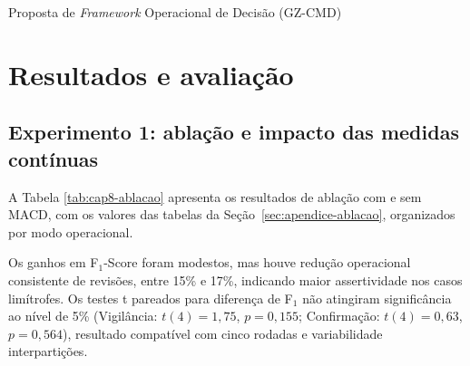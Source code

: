 \begin{chapter}{Proposta de \textit{Framework} Operacional de Decisão (GZ-CMD)}
\section{Resultados e avaliação}
\label{sec:cap8-resultados}

\subsection{Experimento 1: ablação e impacto das medidas contínuas}
\label{sec:cap8-exp1}

A Tabela \ref{tab:cap8-ablacao} apresenta os resultados de ablação com e sem MACD, com os valores das tabelas da Seção~\ref{sec:apendice-ablacao}, organizados por modo operacional.

\begin{table}[!ht]
\centering
\caption{Resultados do experimento de ablação (média $\pm$ desvio-padrão, 5 rodadas). A coluna ``Revisões'' indica o número absoluto de pares encaminhados à revisão por LLM em cada partição de teste.}
\label{tab:cap8-ablacao}
\end{table}

Os ganhos em F$_1$-Score foram modestos, mas houve redução operacional consistente de revisões, entre 15\% e 17\%, indicando maior assertividade nos casos limítrofes. Os testes t pareados para diferença de F$_1$ não atingiram significância ao nível de 5\% (Vigilância: $t(4)=1{,}75$, $p=0{,}155$; Confirmação: $t(4)=0{,}63$, $p=0{,}564$), resultado compatível com cinco rodadas e variabilidade interpartições.


\end{chapter}
